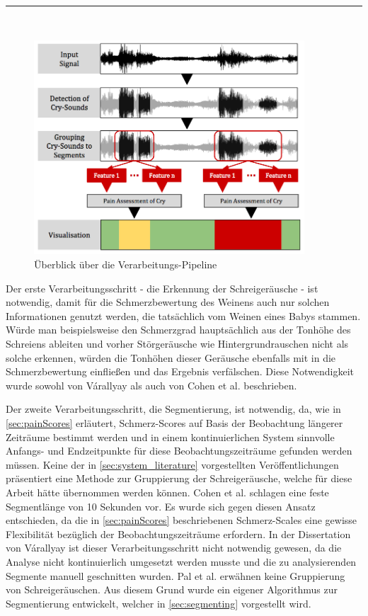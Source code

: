 \noindent\rule{\linewidth}{0.3pt} \\

\begin{figure}[h]
	\centering
	\includegraphics[width=0.9\textwidth]{bilder/konzept04.png}
	\caption{Überblick über die Verarbeitungs-Pipeline}
	\label{img:architecture-overview}
\end{figure}


Der erste Verarbeitungsschritt - die Erkennung der Schreigeräusche - ist notwendig, damit für die Schmerzbewertung des Weinens auch nur solchen Informationen genutzt werden, die tatsächlich vom Weinen eines Babys stammen. Würde man beispielsweise den Schmerzgrad hauptsächlich aus der Tonhöhe des Schreiens ableiten und vorher Störgeräusche wie Hintergrundrauschen nicht als solche erkennen, würden die Tonhöhen dieser Geräusche ebenfalls mit in die Schmerzbewertung einfließen und das Ergebnis verfälschen. Diese Notwendigkeit wurde sowohl von Várallyay \cite{cry_thesis} als auch von Cohen et al. \cite{cohenCry} beschrieben. 

Der zweite Verarbeitungsschritt, die Segmentierung, ist notwendig, da, wie in \autoref{sec:painScores} erläutert, Schmerz-Scores auf Basis der Beobachtung längerer Zeiträume bestimmt werden und in einem kontinuierlichen System sinnvolle Anfangs- und Endzeitpunkte für diese Beobachtungszeiträume gefunden werden müssen. Keine der in \autoref{sec:system_literature} vorgestellten Veröffentlichungen präsentiert eine Methode zur Gruppierung der Schreigeräusche, welche für diese Arbeit hätte übernommen werden können. Cohen et al. \cite{cohenCry} schlagen eine feste Segmentlänge von 10 Sekunden vor. Es wurde sich gegen diesen Ansatz entschieden, da die in \autoref{sec:painScores} beschriebenen Schmerz-Scales eine gewisse Flexibilität bezüglich der Beobachtungszeiträume erfordern. In der Dissertation von Várallyay \cite{cry_thesis} ist dieser Verarbeitungsschritt nicht notwendig gewesen, da die Analyse nicht kontinuierlich umgesetzt werden musste und die zu analysierenden Segmente manuell geschnitten wurden. Pal et al. \cite{palEmotion} erwähnen keine Gruppierung von Schreigeräuschen. Aus diesem Grund wurde ein eigener Algorithmus zur Segmentierung entwickelt, welcher in \autoref{sec:segmenting} vorgestellt wird.

